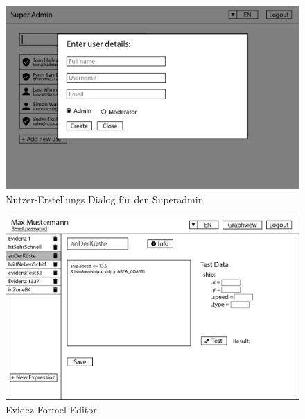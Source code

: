 \documentclass[parskip=full,11pt,twoside]{scrartcl}
\begin{document}
\begin{figure}[ht!]
  \includegraphics[width=\linewidth]{image/GUI-2.png}
  \caption{Nutzer-Erstellungs Dialog für den Superadmin}
  \label{fig:saCreateUsr}
\end{figure}

\begin{figure}[ht!]
  \includegraphics[width=\linewidth]{image/GUI-3.png}
  \caption{Evidez-Formel Editor}
  \label{fig:evdExprEditor}
\end{figure}



\printglossary
\end{document}
